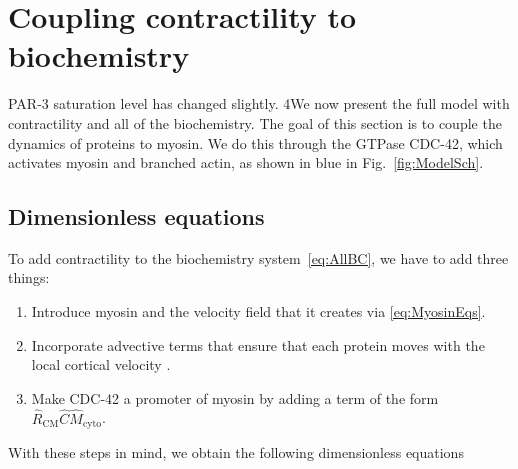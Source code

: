 \documentclass[11pt]{article}
\newcommand{\red}[1]{\color{red}#1\normalcolor}
\newcommand{\6}[1]{#1_{\text{6}}}
\newcommand{\3}[1]{#1_{\text{3}}}
\begin{document}
\section{Coupling contractility to biochemistry \label{sec:WithMy}}
\red{PAR-3 saturation level has changed slightly.} 4We now present the full model with contractility and all of the biochemistry. The goal of this section is to couple the dynamics of proteins to myosin. We do this through the GTPase CDC-42, which activates myosin and branched actin, as shown in blue in Fig.~\ref{fig:ModelSch}.

\subsection{Dimensionless equations}
To add contractility to the biochemistry system\ \eqref{eq:AllBC}, we have to add three things:
\begin{enumerate}
\item Introduce myosin and the velocity field that it creates via \eqref{eq:MyosinEqs}.
\item Incorporate advective terms that ensure that each protein moves with the local cortical velocity \cite{illukkumbura2023design}. 
\item Make CDC-42 a promoter of myosin by adding a term of the form $\hat R_\text{CM} \hat C \hat{M}_\text{cyto}$. 
\end{enumerate}
With these steps in mind, we obtain the following dimensionless equations
\end{document}
